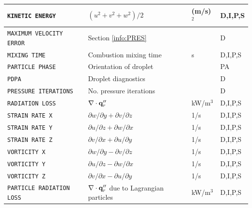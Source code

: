 \documentclass[11pt]{book}
\newcommand{\ct}{\tt\small}
\newcommand{\bq}{{\bf q}}
\begin{document}
\begin{longtable}{@{\extracolsep{\fill}}|l|l|l|l|}
{\ct KINETIC ENERGY}                            & $(u^2+v^2+w^2)/2$                                 & (m/s)$^2$      & D,I,P,S      \\ \hline
{\ct MAXIMUM VELOCITY ERROR}                    & Section \ref{info:PRES}                       &                & D            \\ \hline
{\ct MIXING TIME}                               & Combustion mixing time                            & s              & D,I,P,S      \\ \hline
{\ct PARTICLE PHASE}                             & Orientation of droplet                            &                & PA           \\ \hline
{\ct PDPA}                                      & Droplet diagnostics                               &                & D            \\ \hline
{\ct PRESSURE ITERATIONS}                       & No. pressure iterations                           &                & D            \\ \hline
{\ct RADIATION LOSS}                            & $\nabla \cdot \bq_r''$                            & kW/m$^3$       & D,I,P,S      \\ \hline
{\ct STRAIN RATE X}                             & $\partial w/\partial y + \partial v/\partial z$   & 1/s            & D,I,P,S      \\ \hline
{\ct STRAIN RATE Y}                             & $\partial u/\partial z + \partial w/\partial x$   & 1/s            & D,I,P,S      \\ \hline
{\ct STRAIN RATE Z}                             & $\partial v/\partial x + \partial u/\partial y$   & 1/s            & D,I,P,S      \\ \hline
{\ct VORTICITY X}                               & $\partial w/\partial y - \partial v/\partial z$   & 1/s            & D,I,P,S      \\ \hline
{\ct VORTICITY Y}                               & $\partial u/\partial z - \partial w/\partial x$   & 1/s            & D,I,P,S      \\ \hline
{\ct VORTICITY Z}                               & $\partial v/\partial x - \partial u/\partial y$   & 1/s            & D,I,P,S      \\ \hline
{\ct PARTICLE RADIATION LOSS}                   & $\nabla \cdot \bq_r''$ due to Lagrangian particles& kW/m$^3$       & D,I,P,S      \\ \hline
\end{longtable}
\end{document}
